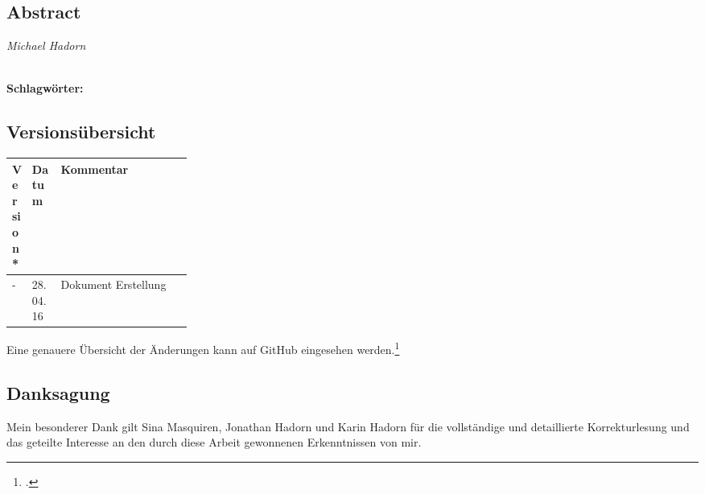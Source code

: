 
\subsection*{Abstract}

\begin{flushright}
	\textit{Michael Hadorn}	
\end{flushright}

\vfill

%
\mbox{}\\[0.5\baselineskip]\noindent
\textbf{Schlagwörter:} 

\newpage
\subsection*{Versionsübersicht}
\begin{center}
	\centering
	\small\renewcommand{\arraystretch}{1.4}
	\begin{tabularx}{1.0\textwidth}{ R{0.1\linewidth} | R{0.16\linewidth} | X  }%
		\hline
		\textbf{Version*} & \textbf{Datum} & \textbf{Kommentar}\\
		\hline
		- & 28.04.16 & Dokument Erstellung \\
		\hline
	\end{tabularx}
\end{center}
\vspace{-1.0\baselineskip}
{\footnotesize * Eine genauere Übersicht der Änderungen kann auf GitHub eingesehen werden.\footcite{github_droneGestures_2015-05-01}}

\vfill

\subsection*{Danksagung}
Mein besonderer Dank gilt Sina Masquiren, Jonathan Hadorn und Karin Hadorn für die vollständige und detaillierte Korrekturlesung und das geteilte Interesse an den durch diese Arbeit gewonnenen Erkenntnissen von mir.\\

